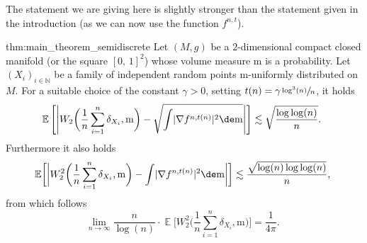 \documentclass[10pt]{amsart}
\theoremstyle{plain}
\theoremstyle{definition}
\numberwithin{equation}{section}
\newcommand{\NN}{\ensuremath{\mathbb N}}
\newcommand{\E}[1]{\ensuremath{\operatorname{\mathbb{E}}\left[#1\right]}}
\newcommand{\bbE}[1]{\ensuremath{\operatorname{\mathbb{E}}\biggl[#1\biggr]}}
\newcommand{\cc}[2]{\ensuremath{\left[#1,\,#2\right]}}
\renewcommand{\comma}{\ensuremath{\text{, }}}
\newcommand{\comma}{\ensuremath{\text{, }}}
\newcommand{\fullstop}{\ensuremath{\text{. }}}
\newcommand{\m}{\ensuremath{\mathrm m}}
\newcommand{\metric}{\ensuremath{g}}
\DeclarePairedDelimiter\abs{\lvert}{\rvert}
\begin{document}
The statement we are giving here is slightly stronger than the statement given in the introduction (as we
can now use the function $f^{n,t}$).
\begin{reptheorem}{thm:main_theorem_semidiscrete}
Let $(M,\metric)$ be a $2$-dimensional compact closed manifold (or the square $\cc01^2$) whose volume
measure $\m$ is a probability.
Let $(X_i)_{i\in\NN}$ be a family of independent random points $\m$-uniformly distributed on $M$.
For a suitable choice of the constant $\gamma>0$, setting $t(n) = \gamma\sfrac{\log^3(n)}{n}$, it holds
\begin{equation*}
\E{\abs*{W_2\biggl(\frac1n\sum_{i=1}^n\delta_{X_i}, \m\biggr)
- \sqrt{\int \abs{\nabla f^{n,t(n)}}^2\de\m}}}
\lesssim \sqrt{\frac{\log\log(n)}n} \fullstop
\end{equation*}
Furthermore it also holds
\begin{equation*}
\bbE{\biggl|W^2_2\biggl(\frac1n\sum_{i=1}^n\delta_{X_i}, \m\biggr) - \int \abs{\nabla f^{n,t(n)}}^2\de\m\biggr|}
\lesssim \frac{\sqrt{\log(n)\log\log(n)}}n \comma
\end{equation*}
from which follows
\begin{equation*}
\lim_{n\to\infty} \frac{n}{\log(n)}\cdot\bbE{W^2_2\biggl(\frac1n\sum_{i=1}^n\delta_{X_i}, \m\biggr)}
=\frac1{4\pi} \fullstop
\end{equation*}
\end{reptheorem}
\end{document}

